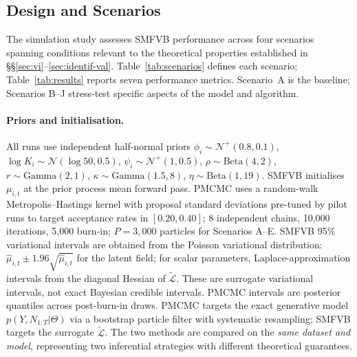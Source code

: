 \documentclass[review,12pt]{elsarticle}
\theoremstyle{definition}
\begin{document}
\subsection{Design and Scenarios}

The simulation study assesses SMFVB performance across four scenarios spanning
conditions relevant to the theoretical properties established in
\S\S\ref{sec:vi}--\ref{sec:identif-val}.
Table~\ref{tab:scenarios} defines each scenario; Table~\ref{tab:results} reports
seven performance metrics.  Scenario~A is the baseline; Scenarios B--J
stress-test specific aspects of the model and algorithm.

\paragraph{Priors and initialisation.}
All runs use independent half-normal priors $\phi_i\sim\mathcal{N}^+(0.8,0.1)$,
$\log K_i\sim\mathcal{N}(\log50,0.5)$, $\psi_i\sim\mathcal{N}^+(1,0.5)$,
$\rho\sim\mathrm{Beta}(4,2)$, $r\sim\mathrm{Gamma}(2,1)$,
$\kappa\sim\mathrm{Gamma}(1.5,8)$, $\eta\sim\mathrm{Beta}(1,19)$.
SMFVB initialises $\mu_{i,t}$ at the prior process mean forward pass.
PMCMC uses a random-walk Metropolis--Hastings kernel with proposal standard
deviations pre-tuned by pilot runs to target acceptance rates in $[0.20,0.40]$;
8 independent chains, 10{,}000 iterations, 5{,}000 burn-in; $P=3{,}000$
particles for Scenarios A--E.  SMFVB 95\% variational intervals are obtained
from the Poisson variational distribution: $\hat\mu_{i,t}\pm1.96\sqrt{\hat\mu_{i,t}}$
for the latent field; for scalar parameters, Laplace-approximation intervals
from the diagonal Hessian of $\tilde{\mathcal{L}}$.
These are surrogate variational intervals, not exact Bayesian credible intervals.  PMCMC intervals are
posterior quantiles across post-burn-in draws.  PMCMC targets the exact
generative model $p(Y,N_{1:T}|\Theta)$ via a bootstrap particle filter with
systematic resampling; SMFVB targets the surrogate $\tilde{\mathcal{L}}$.
The two methods are compared on the \emph{same dataset and model}, representing
two inferential strategies with different theoretical guarantees.
\end{document}

